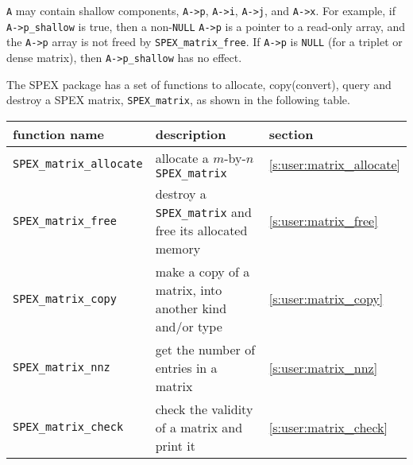 \documentclass[12pt]{report}
\theoremstyle{definition}
\begin{document}
\verb|A| may contain shallow components, \verb|A->p|, \verb|A->i|, \verb|A->j|,
and \verb|A->x|.  For example, if \verb|A->p_shallow| is true, then a
non-\verb|NULL| \verb|A->p| is a pointer to a read-only array, and the
\verb|A->p| array is not freed by \verb|SPEX_matrix_free|.  If \verb|A->p| is
\verb|NULL| (for a triplet or dense matrix), then \verb|A->p_shallow| has no
effect.



%
%

The SPEX package has a set of functions to allocate, copy(convert), query and
destroy a SPEX matrix, \verb|SPEX_matrix|, as shown in the following table.

{\small
\begin{center}
\begin{tabular}{lp{2.5in}l}
\hline
function name & description & section \\
\hline
\verb|SPEX_matrix_allocate|
    & allocate a $m$-by-$n$ \verb|SPEX_matrix|
    & \ref{s:user:matrix_allocate} \\
\hline
\verb|SPEX_matrix_free|
    & destroy a \verb|SPEX_matrix| and free its allocated memory
    & \ref{s:user:matrix_free} \\
\hline
\verb|SPEX_matrix_copy|
    & make a copy of a matrix, into another kind and/or type
    & \ref{s:user:matrix_copy} \\
\hline
\verb|SPEX_matrix_nnz|
    & get the number of entries in a matrix
    & \ref{s:user:matrix_nnz} \\
\hline
\verb|SPEX_matrix_check|
    & check the validity of a matrix and print it
    & \ref{s:user:matrix_check} \\
\hline
\end{tabular}
\end{center}
}
\end{document}

